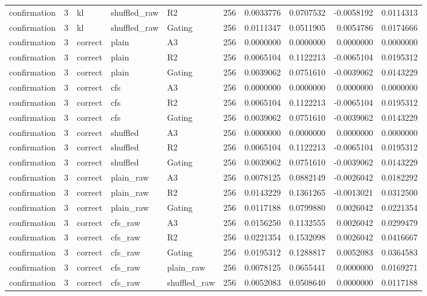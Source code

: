\begin{tabular}{lrlllrrrrr}
confirmation & 3 & kl & shuffled_raw & R2 & 256 & 0.0033776 & 0.0707532 & -0.0058192 & 0.0114313 \\
confirmation & 3 & kl & shuffled_raw & Gating & 256 & 0.0111347 & 0.0511905 & 0.0054786 & 0.0174666 \\
confirmation & 3 & correct & plain & A3 & 256 & 0.0000000 & 0.0000000 & 0.0000000 & 0.0000000 \\
confirmation & 3 & correct & plain & R2 & 256 & 0.0065104 & 0.1122213 & -0.0065104 & 0.0195312 \\
confirmation & 3 & correct & plain & Gating & 256 & 0.0039062 & 0.0751610 & -0.0039062 & 0.0143229 \\
confirmation & 3 & correct & cfs & A3 & 256 & 0.0000000 & 0.0000000 & 0.0000000 & 0.0000000 \\
confirmation & 3 & correct & cfs & R2 & 256 & 0.0065104 & 0.1122213 & -0.0065104 & 0.0195312 \\
confirmation & 3 & correct & cfs & Gating & 256 & 0.0039062 & 0.0751610 & -0.0039062 & 0.0143229 \\
confirmation & 3 & correct & shuffled & A3 & 256 & 0.0000000 & 0.0000000 & 0.0000000 & 0.0000000 \\
confirmation & 3 & correct & shuffled & R2 & 256 & 0.0065104 & 0.1122213 & -0.0065104 & 0.0195312 \\
confirmation & 3 & correct & shuffled & Gating & 256 & 0.0039062 & 0.0751610 & -0.0039062 & 0.0143229 \\
confirmation & 3 & correct & plain_raw & A3 & 256 & 0.0078125 & 0.0882149 & -0.0026042 & 0.0182292 \\
confirmation & 3 & correct & plain_raw & R2 & 256 & 0.0143229 & 0.1361265 & -0.0013021 & 0.0312500 \\
confirmation & 3 & correct & plain_raw & Gating & 256 & 0.0117188 & 0.0799880 & 0.0026042 & 0.0221354 \\
confirmation & 3 & correct & cfs_raw & A3 & 256 & 0.0156250 & 0.1132555 & 0.0026042 & 0.0299479 \\
confirmation & 3 & correct & cfs_raw & R2 & 256 & 0.0221354 & 0.1532098 & 0.0026042 & 0.0416667 \\
confirmation & 3 & correct & cfs_raw & Gating & 256 & 0.0195312 & 0.1288817 & 0.0052083 & 0.0364583 \\
confirmation & 3 & correct & cfs_raw & plain_raw & 256 & 0.0078125 & 0.0655441 & 0.0000000 & 0.0169271 \\
confirmation & 3 & correct & cfs_raw & shuffled_raw & 256 & 0.0052083 & 0.0508640 & 0.0000000 & 0.0117188 \\

\end{tabular}
